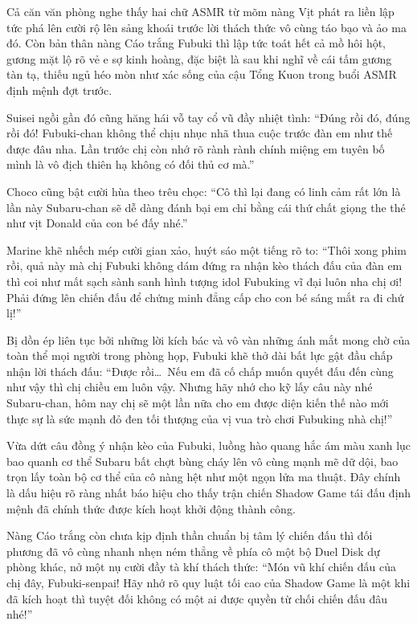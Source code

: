\documentclass[../main.tex]{subfiles}
\begin{document}
Cả căn văn phòng nghe thấy hai chữ ASMR từ mõm nàng Vịt phát ra liền lập tức phá lên cười rộ lên sảng khoái trước lời thách thức vô cùng táo bạo và ảo ma đó. Còn bản thân nàng Cáo trắng Fubuki thì lập tức toát hết cả mồ hôi hột, gương mặt lộ rõ vẻ e sợ kinh hoàng, đặc biệt là sau khi nghĩ về cái tấm gương tàn tạ, thiếu ngủ héo mòn như xác sống của cậu Tổng Kuon trong buổi ASMR định mệnh đợt trước.

Suisei ngồi gần đó cũng hăng hái vỗ tay cổ vũ đầy nhiệt tình: ``Đúng rồi đó, đúng rồi đó! Fubuki-chan không thể chịu nhục nhã thua cuộc trước đàn em như thế được đâu nha. Lần trước chị còn nhớ rõ rành rành chính miệng em tuyên bố mình là vô địch thiên hạ không có đối thủ cơ mà.''

Choco cũng bật cười hùa theo trêu chọc: ``Cô thì lại đang có linh cảm rất lớn là lần này Subaru-chan sẽ dễ dàng đánh bại em chỉ bằng cái thứ chất giọng the thé như vịt Donald của con bé đấy nhé.''

Marine khẽ nhếch mép cười gian xảo, huýt sáo một tiếng rõ to: ``Thôi xong phim rồi, quả này mà chị Fubuki không dám đứng ra nhận kèo thách đấu của đàn em thì coi như mất sạch sành sanh hình tượng idol Fubuking vĩ đại luôn nha chị ơi! Phải đứng lên chiến đấu để chứng minh đẳng cấp cho con bé sáng mắt ra đi chứ lị!''

Bị dồn ép liên tục bởi những lời kích bác và vô vàn những ánh mắt mong chờ của toàn thể mọi người trong phòng họp, Fubuki khẽ thở dài bất lực gật đầu chấp nhận lời thách đấu: ``Được rồi\dots\ Nếu em đã cố chấp muốn quyết đấu đến cùng như vậy thì chị chiều em luôn vậy. Nhưng hãy nhớ cho kỹ lấy câu này nhé Subaru-chan, hôm nay chị sẽ một lần nữa cho em được diện kiến thế nào mới thực sự là sức mạnh đỏ đen tối thượng của vị vua trò chơi Fubuking nhà chị!''

Vừa dứt câu đồng ý nhận kèo của Fubuki, luồng hào quang hắc ám màu xanh lục bao quanh cơ thể Subaru bất chợt bùng cháy lên vô cùng mạnh mẽ dữ dội, bao trọn lấy toàn bộ cơ thể của cô nàng hệt như một ngọn lửa ma thuật. Đây chính là dấu hiệu rõ ràng nhất báo hiệu cho thấy trận chiến Shadow Game tái đấu định mệnh đã chính thức được kích hoạt khởi động thành công.

Nàng Cáo trắng còn chưa kịp định thần chuẩn bị tâm lý chiến đấu thì đối phương đã vô cùng nhanh nhẹn ném thẳng về phía cô một bộ Duel Disk dự phòng khác, nở một nụ cười đầy tà khí thách thức: ``Món vũ khí chiến đấu của chị đây, Fubuki-senpai! Hãy nhớ rõ quy luật tối cao của Shadow Game là một khi đã kích hoạt thì tuyệt đối không có một ai được quyền từ chối chiến đấu đâu nhé!''
\end{document}
